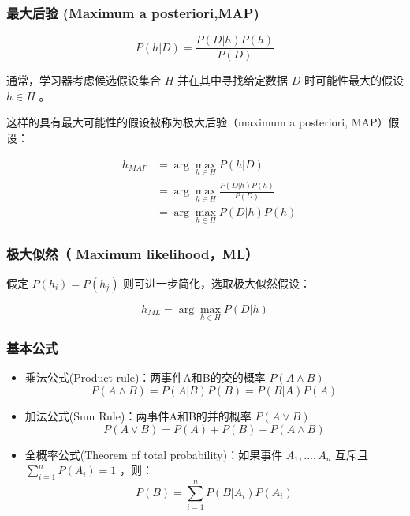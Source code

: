 \documentclass{beamer}
\begin{document}
\begin{frame}
\frametitle{最大后验 (Maximum a posteriori,MAP)}
\label{sec-1-3}


\[ P(h|D) = \frac{P(D|h) P(h)}{P(D)} \]

通常，学习器考虑候选假设集合 $H$ 并在其中寻找给定数据 $D$ 时可能性最大的假设 $h\in H$ 。

这样的具有最大可能性的假设被称为极大后验（maximum a posteriori, MAP）假设：

\begin{eqnarray}
& h_{MAP} & = \arg \max_{h \in H} P(h|D)\nonumber \\
& & = \arg \max_{h \in H} \frac{P(D|h) P(h)}{P(D)} \nonumber \\
& & = \arg \max_{h \in H}P(D|h) P(h) \nonumber
\end{eqnarray}
\end{frame}
\begin{frame}
\frametitle{极大似然（ Maximum likelihood，ML）}
\label{sec-1-4}


假定 $P(h_{i})=P(h_{j})$ 则可进一步简化，选取极大似然假设：

$$h_{ML}=\arg \max_{h \in H}P(D|h)$$
\end{frame}
\begin{frame}
\frametitle{基本公式}
\label{sec-1-5}


\begin{itemize}
\item 乘法公式(Product rule)：两事件A和B的交的概率 $P(A \land B)$
  $$P(A \land B) = P(A|B) P(B) = P(B|A) P(A)$$
\item 加法公式(Sum Rule)：两事件A和B的并的概率 $P(A\lor B)$
  $$P(A \lor B) = P(A) + P(B) - P(A \land B)$$
\item 全概率公式(Theorem of total probability)：如果事件 $A_{1}, \ldots, A_{n}$ 互斥且 $\sum_{i = 1}^{n} P(A_{i}) = 1$ ，则：
  $$P(B) = \sum_{i = 1}^{n} P(B|A_{i}) P(A_{i})$$
\end{itemize}
\end{frame}
\end{document}

